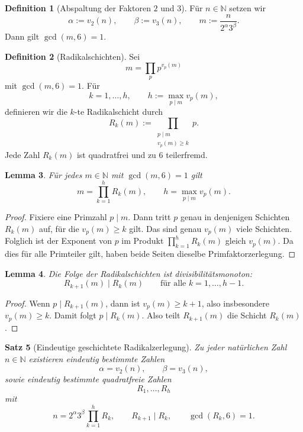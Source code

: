 \documentclass[11pt,a4paper]{article}
\newtheorem{satz}{Satz}
\newtheorem{lemma}[satz]{Lemma}
\theoremstyle{definition}
\newtheorem{definition}[satz]{Definition}
\theoremstyle{remark}
\newcommand{\N}{\mathbb{N}}
\begin{document}
	\begin{definition}[Abspaltung der Faktoren \(2\) und \(3\)]
		Für \(n\in\N\) setzen wir
		\[
		\alpha:=v_2(n),\qquad \beta:=v_3(n),\qquad m:=\frac{n}{2^\alpha 3^\beta}.
		\]
		Dann gilt \(\gcd(m,6)=1\).
	\end{definition}
	
	\begin{definition}[Radikalschichten]
		Sei
		\[
		m=\prod_p p^{v_p(m)}
		\]
		mit \(\gcd(m,6)=1\). Für
		\[
		k=1,\dots,h,\qquad h:=\max_{p\mid m} v_p(m),
		\]
		definieren wir die \(k\)-te Radikalschicht durch
		\[
		R_k(m):=\prod_{\substack{p\mid m\\ v_p(m)\ge k}} p.
		\]
		Jede Zahl \(R_k(m)\) ist quadratfrei und zu \(6\) teilerfremd.
	\end{definition}
	
	\begin{lemma}
		Für jedes \(m\in\N\) mit \(\gcd(m,6)=1\) gilt
		\[
		m=\prod_{k=1}^{h} R_k(m),
		\qquad
		h=\max_{p\mid m} v_p(m).
		\]
	\end{lemma}
	
	\begin{proof}
		Fixiere eine Primzahl \(p\mid m\). Dann tritt \(p\) genau in denjenigen Schichten \(R_k(m)\) auf,
		für die \(v_p(m)\ge k\) gilt. Das sind genau \(v_p(m)\) viele Schichten. Folglich ist der Exponent
		von \(p\) im Produkt \(\prod_{k=1}^{h} R_k(m)\) gleich \(v_p(m)\). Da dies für alle Primteiler gilt,
		haben beide Seiten dieselbe Primfaktorzerlegung.
	\end{proof}
	
	\begin{lemma}
		Die Folge der Radikalschichten ist divisibilitätsmonoton:
		\[
		R_{k+1}(m)\mid R_k(m)
		\qquad \text{für alle } k=1,\dots,h-1.
		\]
	\end{lemma}
	
	\begin{proof}
		Wenn \(p\mid R_{k+1}(m)\), dann ist \(v_p(m)\ge k+1\), also insbesondere \(v_p(m)\ge k\). Damit
		folgt \(p\mid R_k(m)\). Also teilt \(R_{k+1}(m)\) die Schicht \(R_k(m)\).
	\end{proof}
	
	\begin{satz}[Eindeutige geschichtete Radikalzerlegung]
		Zu jeder natürlichen Zahl \(n\in\N\) existieren eindeutig bestimmte Zahlen
		\[
		\alpha=v_2(n),\qquad \beta=v_3(n),
		\]
		sowie eindeutig bestimmte quadratfreie Zahlen
		\[
		R_1,\dots,R_h
		\]
		mit
		\[
		n=2^\alpha 3^\beta \prod_{k=1}^{h} R_k,
		\qquad
		R_{k+1}\mid R_k,
		\qquad
		\gcd(R_k,6)=1.
		\]
	\end{satz}
	
\end{document}
